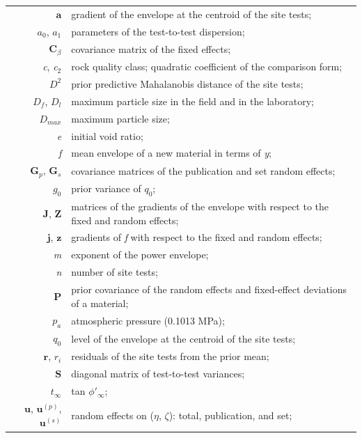\documentclass[Journal,letterpaper]{ascelike-new}
\begin{document}
\begin{longtable}{@{}r@{\hspace{1em}=\hspace{1em}}p{5.0in}@{}}
$\mathbf{a}$ & gradient of the envelope at the centroid of the site tests; \\
$a_0$, $a_1$ & parameters of the test-to-test dispersion; \\
$\mathbf{C}_\beta$ & covariance matrix of the fixed effects; \\
\textit{c}, \textit{c}$_{2}$ & rock quality class; quadratic coefficient of the comparison form; \\
$D^2$ & prior predictive Mahalanobis distance of the site tests; \\
$D_f$, $D_l$ & maximum particle size in the field and in the laboratory; \\
$D_{max}$ & maximum particle size; \\
\textit{e} & initial void ratio; \\
\textit{f} & mean envelope of a new material in terms of \textit{y}; \\
$\mathbf{G}_p$, $\mathbf{G}_s$ & covariance matrices of the publication and set random effects; \\
$g_0$ & prior variance of $q_0$; \\
$\mathbf{J}$, $\mathbf{Z}$ & matrices of the gradients of the envelope with respect to the fixed and random effects; \\
$\mathbf{j}$, $\mathbf{z}$ & gradients of \textit{f} with respect to the fixed and random effects; \\
\textit{m} & exponent of the power envelope; \\
\textit{n} & number of site tests; \\
$\mathbf{P}$ & prior covariance of the random effects and fixed-effect deviations of a material; \\
$p_a$ & atmospheric pressure (0.1013 MPa); \\
$q_0$ & level of the envelope at the centroid of the site tests; \\
$\mathbf{r}$, $r_i$ & residuals of the site tests from the prior mean; \\
$\mathbf{S}$ & diagonal matrix of test-to-test variances; \\
$t_\infty$ & tan $\phi'_\infty$; \\
$\mathbf{u}$, $\mathbf{u}^{(p)}$, $\mathbf{u}^{(s)}$ & random effects on ($\eta$, $\zeta$): total, publication, and set; \\

\end{longtable}
\end{document}
